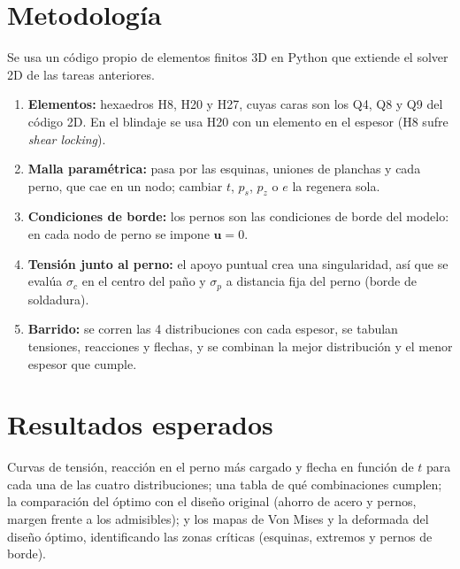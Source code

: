 \documentclass[11pt]{article}
\begin{document}
\section{Metodolog\'ia}

Se usa un c\'odigo propio de elementos finitos 3D en Python que extiende el solver 2D de las tareas
anteriores.
\begin{enumerate}
  \item \textbf{Elementos:} hexaedros H8, H20 y H27, cuyas caras son los Q4, Q8 y Q9 del c\'odigo 2D. En
        el blindaje se usa H20 con un elemento en el espesor (H8 sufre \emph{shear locking}).
  \item \textbf{Malla param\'etrica:} pasa por las esquinas, uniones de planchas y cada perno, que cae
        en un nodo; cambiar $t$, $p_s$, $p_z$ o $e$ la regenera sola.
  \item \textbf{Condiciones de borde:} los pernos son las condiciones de borde del modelo: en cada
        nodo de perno se impone $\mathbf u = 0$.
  \item \textbf{Tensi\'on junto al perno:} el apoyo puntual crea una singularidad, as\'i que se eval\'ua
        $\sigma_c$ en el centro del pa\~no y $\sigma_p$ a distancia fija del perno (borde de soldadura).
  \item \textbf{Barrido:} se corren las 4 distribuciones con cada espesor, se tabulan tensiones,
        reacciones y flechas, y se combinan la mejor distribuci\'on y el menor espesor que cumple.
\end{enumerate}

\section{Resultados esperados}

Curvas de tensi\'on, reacci\'on en el perno m\'as cargado y flecha en funci\'on de $t$ para cada
una de las cuatro distribuciones; una tabla de qu\'e combinaciones cumplen; la comparaci\'on del
\'optimo con el dise\~no original (ahorro de acero y pernos, margen frente a los admisibles); y los mapas de Von Mises y la
deformada del dise\~no \'optimo, identificando las zonas cr\'iticas (esquinas, extremos y pernos de
borde).
\end{document}
